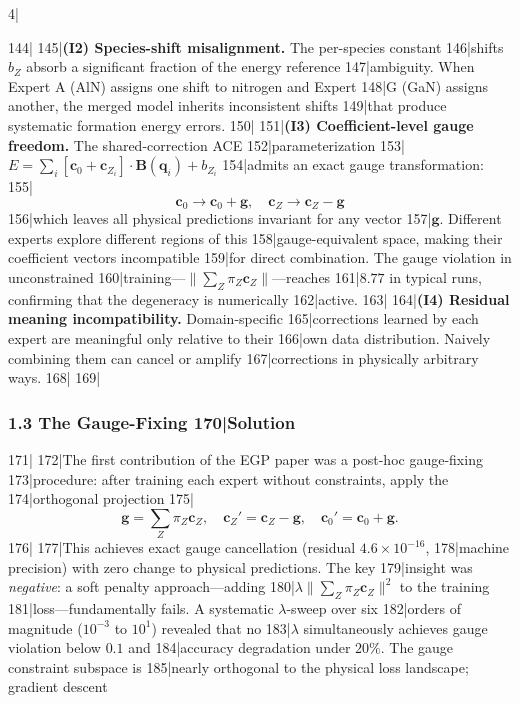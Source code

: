 4|\documentclass[
5|  12pt,
6|]{article}
\begin{document}
144|
145|\textbf{(I2) Species-shift misalignment.} The per-species constant
146|shifts \(b_Z\) absorb a significant fraction of the energy reference
147|ambiguity. When Expert A (AlN) assigns one shift to nitrogen and Expert
148|G (GaN) assigns another, the merged model inherits inconsistent shifts
149|that produce systematic formation energy errors.
150|
151|\textbf{(I3) Coefficient-level gauge freedom.} The shared-correction ACE
152|parameterization
153|\(E = \sum_i [{\mathbf{c}}_0 + {\mathbf{c}}_{Z_i}] \cdot {\mathbf{B}}({\mathbf{q}}_i) + b_{Z_i}\)
154|admits an exact gauge transformation:
155|\[{\mathbf{c}}_0 \to {\mathbf{c}}_0 + {\mathbf{g}}, \quad {\mathbf{c}}_Z \to {\mathbf{c}}_Z - {\mathbf{g}}\]
156|which leaves all physical predictions invariant for any vector
157|\({\mathbf{g}}\). Different experts explore different regions of this
158|gauge-equivalent space, making their coefficient vectors incompatible
159|for direct combination. The gauge violation in unconstrained
160|training---\(\lVert\sum_Z \pi_Z {\mathbf{c}}_Z\rVert\)---reaches
161|\(8.77\) in typical runs, confirming that the degeneracy is numerically
162|active.
163|
164|\textbf{(I4) Residual meaning incompatibility.} Domain-specific
165|corrections learned by each expert are meaningful only relative to their
166|own data distribution. Naively combining them can cancel or amplify
167|corrections in physically arbitrary ways.
168|
169|\subsubsection{1.3 The Gauge-Fixing
170|Solution}\label{the-gauge-fixing-solution}
171|
172|The first contribution of the EGP paper was a post-hoc gauge-fixing
173|procedure: after training each expert without constraints, apply the
174|orthogonal projection
175|\[{\mathbf{g}} = \sum_Z \pi_Z {\mathbf{c}}_Z, \quad {\mathbf{c}}_Z' = {\mathbf{c}}_Z - {\mathbf{g}}, \quad {\mathbf{c}}_0' = {\mathbf{c}}_0 + {\mathbf{g}}.\]
176|
177|This achieves exact gauge cancellation (residual \(4.6\times10^{-16}\),
178|machine precision) with zero change to physical predictions. The key
179|insight was \emph{negative}: a soft penalty approach---adding
180|\(\lambda\lVert\sum_Z\pi_Z{\mathbf{c}}_Z\rVert^2\) to the training
181|loss---fundamentally fails. A systematic \(\lambda\)-sweep over six
182|orders of magnitude (\(10^{-3}\) to \(10^1\)) revealed that no
183|\(\lambda\) simultaneously achieves gauge violation below \(0.1\) and
184|accuracy degradation under \(20\%\). The gauge constraint subspace is
185|nearly orthogonal to the physical loss landscape; gradient descent
\end{document}
